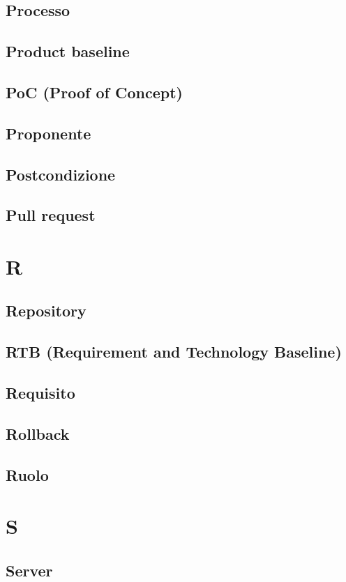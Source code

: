 \documentclass[12pt]{article}
\begin{document}
		\subsection{Processo}
		\subsection{Product baseline}
		\subsection{PoC (Proof of Concept)}
		\subsection{Proponente}
		\subsection{Postcondizione}
		\subsection{Pull request}
	\clearpage
	\section{R}
		\subsection{Repository}
		\subsection{RTB (Requirement and Technology Baseline)}
		\subsection{Requisito}
		\subsection{Rollback}
		\subsection{Ruolo}
	\clearpage
	\section{S}
		\subsection{Server}
\end{document}
